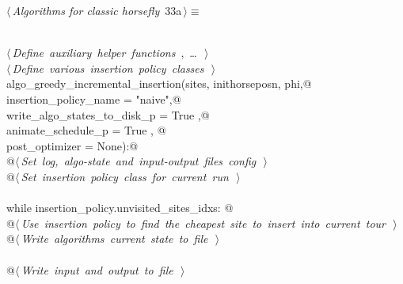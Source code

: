 \documentclass[11.5pt]{report}
\begin{document}
\begin{flushleft} \small\label{scrap37}\raggedright\small
{} $\langle\,${\itshape Algorithms for classic horsefly}\nobreak\ {\footnotesize {33a}}$\,\rangle\equiv$
\vspace{-1ex}
\begin{list}{}{} \item
\mbox{}\verb@@\\
\mbox{}\verb@@\hbox{$\langle\,${\itshape Define auxiliary helper functions}\nobreak\ {\footnotesize {}, \ldots\ }$\,\rangle$}\verb@@\\
\mbox{}\verb@@\hbox{$\langle\,${\itshape Define various insertion policy classes}\nobreak\ {\footnotesize {}}$\,\rangle$}\verb@@\\
\mbox{}\verb@def algo_greedy_incremental_insertion(sites, inithorseposn, phi,@\\
\mbox{}\verb@                                      insertion_policy_name       = "naive",@\\
\mbox{}\verb@                                      write_algo_states_to_disk_p = True   ,@\\
\mbox{}\verb@                                      animate_schedule_p          = True   , @\\
\mbox{}\verb@                                      post_optimizer              = None):@\\
\mbox{}\verb@      @\hbox{$\langle\,${\itshape Set log, algo-state and input-output files config}\nobreak\ {\footnotesize {}}$\,\rangle$}\verb@@\\
\mbox{}\verb@      @\hbox{$\langle\,${\itshape Set insertion policy class for current run}\nobreak\ {\footnotesize {}}$\,\rangle$}\verb@@\\
\mbox{}\verb@@\\
\mbox{}\verb@      while insertion_policy.unvisited_sites_idxs: @\\
\mbox{}\verb@         @\hbox{$\langle\,${\itshape Use insertion policy to find the cheapest site to insert into current tour}\nobreak\ {\footnotesize {}}$\,\rangle$}\verb@@\\
\mbox{}\verb@         @\hbox{$\langle\,${\itshape Write algorithms current state to file}\nobreak\ {\footnotesize {}}$\,\rangle$}\verb@@\\
\mbox{}\verb@@\\
\mbox{}\verb@      @\hbox{$\langle\,${\itshape Write input and output to file}\nobreak\ {\footnotesize {}}$\,\rangle$}\verb@@\\

\end{list}
\end{flushleft}
\end{document}
